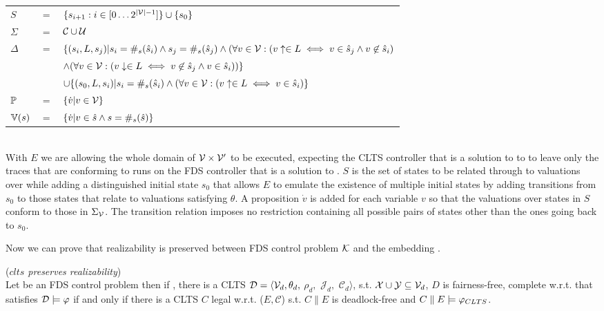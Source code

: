 \vspace{1em}
\begin{tabular}{ l c l }
	$S$ &$=$& $\{s_{i+1} : i \in [0\ldots2^{|{\mathcal{V}}|-1}] \}\cup \{s_0\}$\\
	$\Sigma$ &$=$&$\mathcal{C} \cup \mathcal{U}$\\	
	$\Delta$&$=$&$\{(s_i,L,s_j) | s_i = \#_s(\hat{s}_i) \wedge  s_j = \#_s(\hat{s}_j) \wedge (\forall v \in {\ensuremath{\mathcal{V}}}: (v\uparrow \in L \iff v \in \hat{s}_j \wedge v \not\in \hat{s}_i)$\\
	&&$\wedge (\forall v \in {\ensuremath{\mathcal{V}}}: (v\downarrow \in L \iff v \not\in \hat{s}_j \wedge v \in \hat{s}_i))\}$\\
	&&$\cup \{ (s_0,L,s_i)| s_i = \#_s(\hat{s}_i) \wedge (\forall v \in {\ensuremath{\mathcal{V}}}: (v\uparrow \in L \iff v \in \hat{s}_i)\}$\\
	$\mathbb{P}$&$=$&$\{\dot{v} | v \in {\ensuremath{\mathcal{V}}}\}$\\
	$\mathbb{V}(s)$&$=$&$\{\dot{v}| v \in \hat{s} \wedge s = \#_s(\hat{s})\}$\\
\end{tabular}
\vspace{1em}
\\
With $E$ we are allowing the whole domain of ${\mathcal{V}} \times {\ensuremath{\mathcal{V}}}'$ to be executed, expecting the CLTS controller that is a solution to \cltsCPEmbedding to to leave only the traces that are conforming to runs on \fdsD the FDS controller that is a solution to \fdsControlProblem. $S$ is the set of states to be related through \enumStateSetDef to valuations over \gsV while adding a distinguished initial state $s_0$ that allows $E$ to emulate the existence of multiple initial states by adding transitions from $s_0$ to those states that relate to valuations satisfying $\theta$. A proposition $\dot{v}$ is added for each variable $v$ so that the valuations over states in $S$ conform to those in $\Sigma_{{\mathcal{V}}}$. The transition relation imposes no restriction containing all possible pairs of states other than the ones going back to $s_0$.

Now we can prove that realizability is preserved between FDS control problem $\mathcal{K}$ and the embedding \cltsCPEmbedding.

\begin{theorem}(\emph{$clts$ preserves realizability})\label{theorem:clts_preserves_realizability}\\
	Let \fdsControlProblemDef be an FDS control problem  then if \cltsCPEmbeddingDef, there is a CLTS $\mathcal{D}= \langle \mathcal{V}_d, \theta_d,$ $\rho_d,$ $\mathcal{J}_d,$ $\mathcal{C}_d\rangle$, s.t. ${\mathcal{X}} \cup {\ensuremath{\mathcal{Y}}} \subseteq \mathcal{V}_d$, $D$ is fairness-free, complete w.r.t. \gsX that satisfies $\mathcal{D} \models \varphi$
	if and only if there is a CLTS $C$ legal w.r.t. ($E,\mathcal{C}$) s.t. $C \parallel E$ is deadlock-free and $C \parallel E \models \varphi_{CLTS}$.
	\normalsize
\end{theorem}

